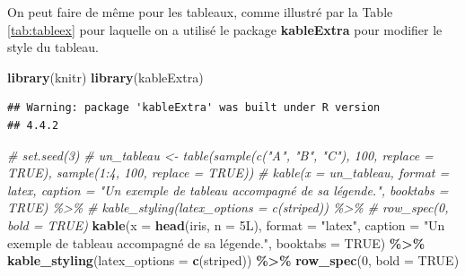 \documentclass[french,]{compterendu}
\newenvironment{Shaded}{\begin{snugshade}}{\end{snugshade}}
\newcommand{\AttributeTok}[1]{\textcolor[rgb]{0.13,0.29,0.53}{#1}}
\newcommand{\CommentTok}[1]{\textcolor[rgb]{0.56,0.35,0.01}{\textit{#1}}}
\newcommand{\ConstantTok}[1]{\textcolor[rgb]{0.56,0.35,0.01}{#1}}
\newcommand{\DataTypeTok}[1]{\textcolor[rgb]{0.13,0.29,0.53}{#1}}
\newcommand{\DecValTok}[1]{\textcolor[rgb]{0.00,0.00,0.81}{#1}}
\newcommand{\FunctionTok}[1]{\textcolor[rgb]{0.13,0.29,0.53}{\textbf{#1}}}
\newcommand{\NormalTok}[1]{#1}
\newcommand{\SpecialCharTok}[1]{\textcolor[rgb]{0.81,0.36,0.00}{\textbf{#1}}}
\newcommand{\StringTok}[1]{\textcolor[rgb]{0.31,0.60,0.02}{#1}}
\theoremstyle{urcastyle}
\theoremstyle{remark}
\begin{document}
On peut faire de même pour les tableaux, comme illustré par la Table \ref{tab:tableex} pour laquelle on a utilisé le package \textbf{kableExtra} \autocite{pkgkableExtra} pour modifier le style du tableau.



\begin{Shaded}
\begin{Highlighting}[]
\FunctionTok{library}\NormalTok{(}\StringTok{\textquotesingle{}knitr\textquotesingle{}}\NormalTok{)}
\FunctionTok{library}\NormalTok{(}\StringTok{\textquotesingle{}kableExtra\textquotesingle{}}\NormalTok{)}
\end{Highlighting}
\end{Shaded}

\begin{verbatim}
## Warning: package 'kableExtra' was built under R version
## 4.4.2
\end{verbatim}

\begin{Shaded}
\begin{Highlighting}[]
\CommentTok{\# set.seed(3)}
\CommentTok{\# un\_tableau \textless{}{-} table(sample(c("A", "B", "C"), 100, replace = TRUE), sample(1:4, 100, replace = TRUE))}
\CommentTok{\# kable(x = un\_tableau, format = \textquotesingle{}latex\textquotesingle{}, caption = "Un exemple de tableau accompagné de sa légende.", booktabs = TRUE) \%\textgreater{}\%}
\CommentTok{\#   kable\_styling(latex\_options = c(\textquotesingle{}striped\textquotesingle{})) \%\textgreater{}\%}
\CommentTok{\#   row\_spec(0, bold = TRUE)}
\FunctionTok{kable}\NormalTok{(}\AttributeTok{x =} \FunctionTok{head}\NormalTok{(iris,  }\AttributeTok{n =} \DecValTok{5}\DataTypeTok{L}\NormalTok{), }\AttributeTok{format =} \StringTok{"latex"}\NormalTok{,}
      \AttributeTok{caption =}  \StringTok{"Un exemple de tableau accompagné de sa légende."}\NormalTok{, }
      \AttributeTok{booktabs =} \ConstantTok{TRUE}\NormalTok{) }\SpecialCharTok{\%\textgreater{}\%}
  \FunctionTok{kable\_styling}\NormalTok{(}\AttributeTok{latex\_options =} \FunctionTok{c}\NormalTok{(}\StringTok{\textquotesingle{}striped\textquotesingle{}}\NormalTok{)) }\SpecialCharTok{\%\textgreater{}\%}
  \FunctionTok{row\_spec}\NormalTok{(}\DecValTok{0}\NormalTok{, }\AttributeTok{bold =} \ConstantTok{TRUE}\NormalTok{)}
\end{Highlighting}
\end{Shaded}
\end{document}
